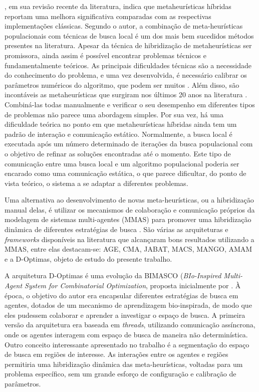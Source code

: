 , em sua revisão recente da literatura, indica que metaheurísticas híbridas reportam uma melhora significativa comparadas com as respectivas implementações clássicas. Segundo o autor, a combinação de meta-heurísticas populacionais com técnicas de busca local é um dos mais bem sucedidos métodos presentes na literatura. Apesar da técnica de hibridização de metaheurísticas ser promissora, ainda assim é possível encontrar problemas técnicos e fundamentalmente teóricos. As principais dificuldades técnicas são a necessidade do conhecimento do problema, e uma vez desenvolvida, é necessário calibrar os parâmetros numéricos do algoritmo, que podem ser muitos \cite{stutzle2018}. Além disso, são incontáveis as metaheurísticas que surgiram nos últimos 20 anos na literatura \cite{dokeroglu2019}. Combiná-las todas manualmente e verificar o seu desempenho em diferentes tipos de problemas não parece uma abordagem simples. Por sua vez, há uma dificuldade teórica no ponto em que metaheurísticas híbridas ainda tem um padrão de interação e comunicação estático. Normalmente, a busca local é executada após um número determinado de iterações da busca populacional com o objetivo de refinar as soluções encontradas até o momento. Este tipo de comunicação entre uma busca local e um algoritmo populacional poderia ser encarado como uma comunicação estática, o que parece dificultar, do ponto de vista teórico, o sistema a se adaptar a diferentes problemas.

Uma alternativa ao desenvolvimento de novas meta-heurísticas, ou a hibridização manual delas, é utilizar os mecanismos de colaboração e comunicação próprios da modelagem de sistemas multi-agentes (MMAS) para promover uma hibridização dinâmica de diferentes estratégias de busca \cite{gong2015, zheng2015, fernandes2009, milano2004}. São várias as arquiteturas e \textit{frameworks} disponíveis na literatura que alcançaram bons resultados utilizando a MMAS, entre elas destacam-se: AGE, CMA, JABAT, MACS, MANGO, AMAM \cite{silva2018} e a D-Optimas, objeto de estudo do presente trabalho.

A arquitetura D-Optimas é uma evolução da BIMASCO (\textit{BIo-Inspired Multi-Agent System for Combinatorial Optimization}, proposta inicialmente por . À época, o objetivo do autor era encapsular diferentes estratégias de busca em agentes, dotados de um mecanismo de aprendizagem bio-inspirada, de modo que eles pudessem colaborar e aprender a investigar o espaço de busca. A primeira versão da arquitetura era baseada em \textit{threads}, utilizando comunicação assíncrona, onde os agentes interagem com espaço de busca de maneira não determinística. Outro conceito interessante apresentado no trabalho é a segmentação do espaço de busca em regiões de interesse. 
As interações entre os agentes e regiões permitiria uma hibridização dinâmica das meta-heurísticas, voltadas para um problema específico, sem um grande esforço de configuração e calibração de parâmetros.

